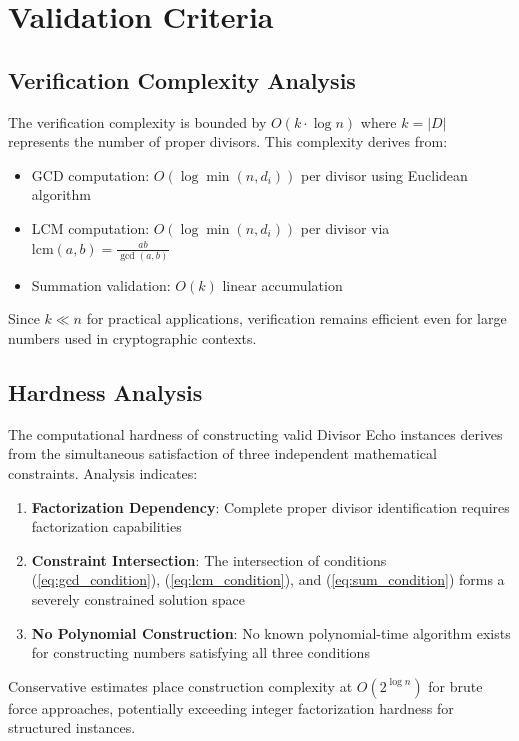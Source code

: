 \documentclass[11pt,letterpaper]{article}
\begin{document}
\section{Validation Criteria}

\subsection{Verification Complexity Analysis}

The verification complexity is bounded by $O(k \cdot \log n)$ where $k = |D|$ represents the number of proper divisors. This complexity derives from:

\begin{itemize}
\item GCD computation: $O(\log \min(n,d_i))$ per divisor using Euclidean algorithm
\item LCM computation: $O(\log \min(n,d_i))$ per divisor via $\text{lcm}(a,b) = \frac{ab}{\gcd(a,b)}$
\item Summation validation: $O(k)$ linear accumulation
\end{itemize}

Since $k \ll n$ for practical applications, verification remains efficient even for large numbers used in cryptographic contexts.

\subsection{Hardness Analysis}

The computational hardness of constructing valid Divisor Echo instances derives from the simultaneous satisfaction of three independent mathematical constraints. Analysis indicates:

\begin{enumerate}
\item \textbf{Factorization Dependency}: Complete proper divisor identification requires factorization capabilities
\item \textbf{Constraint Intersection}: The intersection of conditions (\ref{eq:gcd_condition}), (\ref{eq:lcm_condition}), and (\ref{eq:sum_condition}) forms a severely constrained solution space
\item \textbf{No Polynomial Construction}: No known polynomial-time algorithm exists for constructing numbers satisfying all three conditions
\end{enumerate}

Conservative estimates place construction complexity at $O(2^{\log n})$ for brute force approaches, potentially exceeding integer factorization hardness for structured instances.
\end{document}
